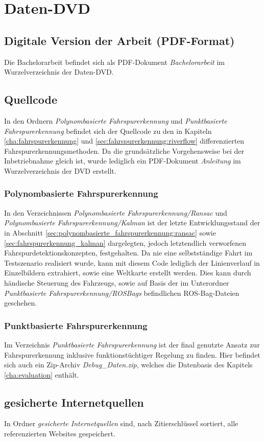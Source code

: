\appendix
{} %
\newcommand{\fdname}[1]{\emph{#1}}
\chapter{Daten-DVD}	
\section{Digitale Version der Arbeit (PDF-Format)}
Die Bachelorarbeit befindet sich als PDF-Dokument \fdname{Bachelorarbeit} im Wurzelverzeichnis der Daten-DVD.

\section{Quellcode}
In den Ordnern \fdname{Polynombasierte Fahrspurerkennung} und \fdname{Punktbasierte Fahrspurerkennung} befindet sich der Quellcode zu den in Kapiteln \ref{cha:fahrspurerkennung} und \ref{sec:fahrspurerkennung:riverflow} differenzierten Fahrspurerkennungsmethoden. Da die grundsätzliche Vorgehensweise bei der Inbetriebnahme gleich ist, wurde lediglich ein PDF-Dokument \fdname{Anleitung} im Wurzelverzeichnis der DVD erstellt.

\subsection{Polynombasierte Fahrspurerkennung}
In den Verzeichnissen \fdname{Polynombasierte Fahrspurerkennung/Ransac} und \fdname{Polynombasierte Fahrspurerkennung/Kalman} ist der letzte Entwicklungsstand der in Abschnitt \ref{sec:polynombasierte_fahrspurerkennung:ransac} sowie \ref{sec:fahrspurerkennung_kalman} dargelegten, jedoch letztendlich verworfenen Fahrspurdetektionskonzepten, festgehalten. Da nie eine selbstständige Fahrt im Testszenario realisiert wurde, kann mit diesem Code lediglich der Linienverlauf in Einzelbildern extrahiert, sowie eine Weltkarte erstellt werden. Dies kann durch händische Steuerung des Fahrzeugs, sowie auf Basis der im Unterordner \fdname{Punktbasierte Fahrspurerkennung/ROSBags} befindlichen
ROS-Bag-Dateien geschehen.

\subsection{Punktbasierte Fahrspurerkennung}
\label{anhang:quellcode:punktbasierte}
Im Verzeichnis \fdname{Punktbasierte Fahrspurerkennung} ist der final genutzte Ansatz zur Fahrspurerkennung inklusive funktionstüchtiger Regelung zu finden. Hier befindet sich auch ein Zip-Archiv \fdname{Debug\_Daten.zip}, welches die Datenbasis des Kapitels \ref{cha:evaluation} enthält.

\section{gesicherte Internetquellen}
In Ordner \fdname{gesicherte Internetquellen} sind, nach Zitierschlüssel sortiert, alle referenzierten Websites gespeichert.
